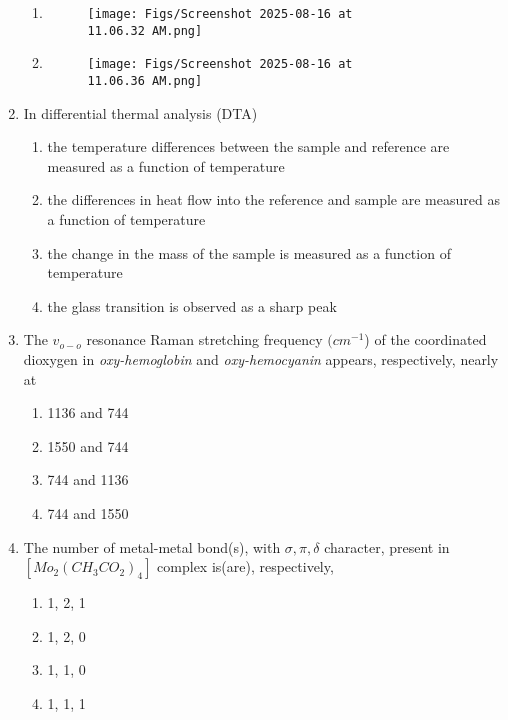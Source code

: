 \documentclass[12pt]{article}
\begin{document}
\begin{enumerate}
\begin{enumerate}
\item  \begin{figure}[H]
\centering
\texttt{[image: Figs/Screenshot 2025-08-16 at 11.06.32 AM.png]}
\caption{}
\end{figure}

\item  
\begin{figure}[H]
\centering
\texttt{[image: Figs/Screenshot 2025-08-16 at 11.06.36 AM.png]}
\caption{}
\end{figure}
\end{enumerate}

\item In differential thermal analysis (DTA)

\begin{enumerate}
    \item the temperature differences between the sample and reference are measured as a
function of temperature
    \item the differences in heat flow into the reference and sample are measured as a function
of temperature
    \item the change in the mass of the sample is measured as a function of temperature
    \item the glass transition is observed as a sharp peak
\end{enumerate}

\item The $v_{o-o}$ resonance Raman stretching frequency $(cm^{-1}$) of the coordinated
dioxygen in \textit{oxy-hemoglobin} and \textit{oxy-hemocyanin} appears, respectively, nearly at

\begin{enumerate}
    \item 1136 and 744
    \item 1550 and 744
    \item 744 and 1136
    \item 744 and 1550
\end{enumerate}

\item The number of metal-metal bond(s), with $\sigma , \pi, \delta$ character, present in
$[Mo_2(CH_3CO_2)_4]$ complex is(are), respectively,

\begin{enumerate}
    \item 1, 2, 1
    \item 1, 2, 0
    \item 1, 1, 0
    \item 1, 1, 1
\end{enumerate}


\end{enumerate}
\end{document}
